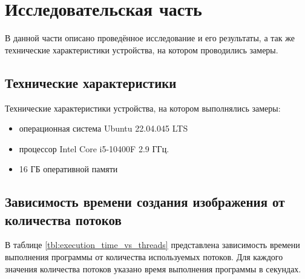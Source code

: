\chapter{Исследовательская часть}
В данной части описано проведённое исследование и его результаты,
а так же технические характеристики устройства, на котором проводились
замеры.

\section{Технические характеристики}
Технические характеристики устройства, на котором выполнялись
замеры:
\begin{itemize}
\item операционная система Ubuntu 22.04.045 LTS
\item процессор Intel Core i5-10400F 2.9 ГГц.
\item 16 ГБ оперативной памяти
\end{itemize}

\section{Зависимость времени создания изображения от количества потоков}
В таблице \ref{tbl:execution_time_vs_threads} представлена зависимость времени выполнения программы от количества используемых потоков. Для каждого значения количества потоков указано время выполнения программы в секундах.


